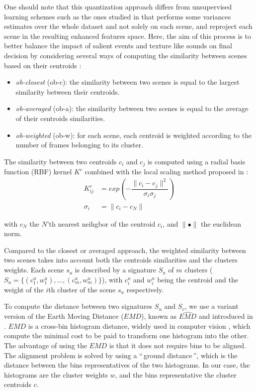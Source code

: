 \documentclass[journal]{IEEEtran}
\begin{document}
One should note that this quantization approach differs from unsupervised learning schemes such as the ones studied in \cite{bisot2016acoustic} that performs some variances estimates over the whole dataset and not solely on each scene, and reproject each scene in the resulting enhanced features space. Here, the aim of this process is to better balance the impact of salient events and texture like sounds on final decision by considering several ways of computing the similarity between scenes based on their centroids :

\begin{itemize}
\item \emph{ob-closest} (ob-c): the similarity between two scenes is equal to the largest similarity between their centroids.
\item \emph{ob-averaged} (ob-a): the similarity between two scenes is equal to the average of their centroids similarities.
\item \emph{ob-weighted} (ob-w): for each scene, each centroid is weighted according to the number of frames belonging to its cluster.
\end{itemize}

The similarity between two centroids $c_i$ and $c_j$ is computed using a radial basis function (RBF) kernel $K^c$ combined with the local scaling method proposed in \cite{selfTuneManor2004}: \\
\begin{equation}
\label{eq:kc}
\begin{split}
K^c_{ij} & =exp\left( - \dfrac{\parallel c_i - c_j \parallel^2}{\sigma_{i}\sigma_{j}} \right) \\
\sigma_{i} & =\parallel c_i - c_N \parallel
\end{split}
\end{equation}

with $c_N$ the $N$'th nearest neihgbor of the centroid $c_i$, and $\parallel \bullet \parallel$ the euclidean norm. 

Compared to the closest or averaged approach, the  weighted similarity between two scenes takes into account both the centroids similarities and the clusters weights. Each scene $s_u$ is described by a signature $S_u$ of $m$ clusters ($S_u=\lbrace(c_1^u,w_1^u),\ldots,(c_m^u,w_m^u)\rbrace$), with $c_i^u$ and $w_i^u$ being the centroid and the weight of the $i$th cluster of the scene $s_u$ respectively. 

To compute the distance between two signatures $S_u$ and $S_v$, we use a variant version of the Earth Moving Distance ($EMD$), known as $\widehat{EMD}$ and introduced in \cite{pele2008linear}. $EMD$ is a cross-bin histogram distance, widely used in computer vision \cite{zhang2007local}, which compute the minimal cost to be paid to transform one histogram into the other. The advantage of using the $EMD$ is that it does not require bins to be aligned. The alignment problem is solved by using a ``\,ground distance\,'', which is the distance between the bins representatives of the two histograms. In our case, the histograms are the cluster weights $w$, and the bins representative the cluster centroids $c$.
\end{document}
